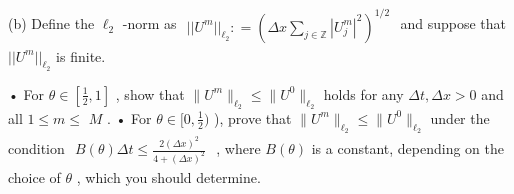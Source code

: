 \begin{exercise}
(b) Define the $\ell _ { 2 }$ -norm as $\begin{array} { r } { \vert \vert U ^ { m } \vert \vert _ { \ell _ { 2 } } : = \left( \Delta x \sum _ { j \in \mathbb { Z } } | U _ { j } ^ { m } | ^ { 2 } \right) ^ { 1 / 2 } } \end{array}$ and suppose that $| | U ^ { m } | | _ { \ell _ { 2 } }$ is finite.

• For $\theta \in [ \frac { 1 } { 2 } , 1 ]$ , show that $\| U ^ { m } \| _ { \ell _ { 2 } } \leq \| U ^ { 0 } \| _ { \ell _ { 2 } }$ holds for any $\Delta t , \Delta x > 0$ and all $1 \leq m \leq$ $M$ .   
• For $\theta \in [ 0 , \frac { 1 } { 2 } )$ ), prove that $\| U ^ { m } \| _ { \ell _ { 2 } } \leq \| U ^ { 0 } \| _ { \ell _ { 2 } }$ under the condition $\begin{array} { r } { B ( \theta ) \Delta t \leq \frac { 2 ( \Delta x ) ^ { 2 } } { 4 + ( \Delta x ) ^ { 2 } } } \end{array}$ , where $B ( \theta )$ is a constant, depending on the choice of $\theta$ , which you should determine.
\end{exercise}

